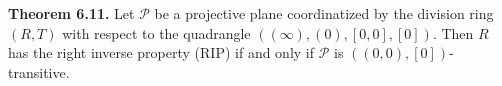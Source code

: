 \textbf{Theorem 6.11.} Let $\mathcal{P}$ be a projective plane coordinatized by the division ring $(R,T)$ with respect to the quadrangle $((\infty), (0), [0,0], [0])$. Then $R$ has the right inverse property (RIP) if and only if $\mathcal{P}$ is $((0,0), [0])$-transitive.
